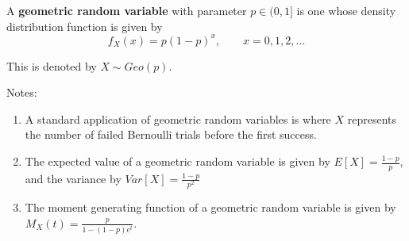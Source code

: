 \documentclass{article}
\begin{document}
A \textbf{geometric random variable} with parameter $p\in(0,1]$ is one whose density distribution function is given by
\begin{equation*}
f_X(x) = p(1-p)^x,\qquad x=0,1,2,\dotsc
\end{equation*}

This is denoted by $X\sim Geo(p)$.

Notes:
\begin{enumerate}
\item A standard application of geometric random variables is where $X$ represents the number of failed Bernoulli trials before the first success.
\item The expected value of a geometric random variable is given by $E[X] = \frac{1-p}{p}$, and the variance by $Var[X] = \frac{1-p}{p^2}$
\item The moment generating function of a geometric random variable is given by $M_X(t) = \frac{p}{1 - (1-p)e^t}$.

\end{enumerate}
\end{document}
